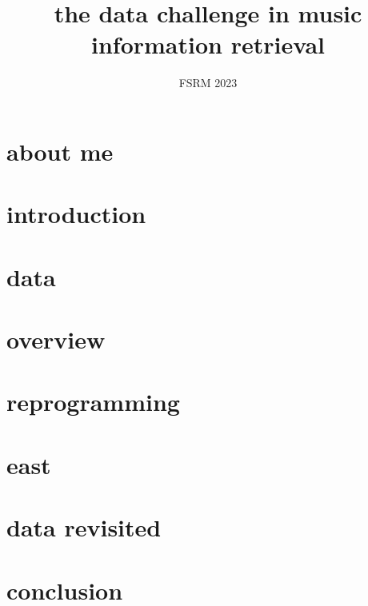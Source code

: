 

\title{the data challenge in music information retrieval}
\subtitle{FSRM 2023} 


	

    \section[about]{about me}
        
        
    \section[intro]{introduction}
        
        
    \section{data}
        
        
    \section{overview}        
				
    
    
    \section{reprogramming}
        
    
    \section{east}
        
    
    \section{data revisited}
        

    \section{conclusion}
        
        



